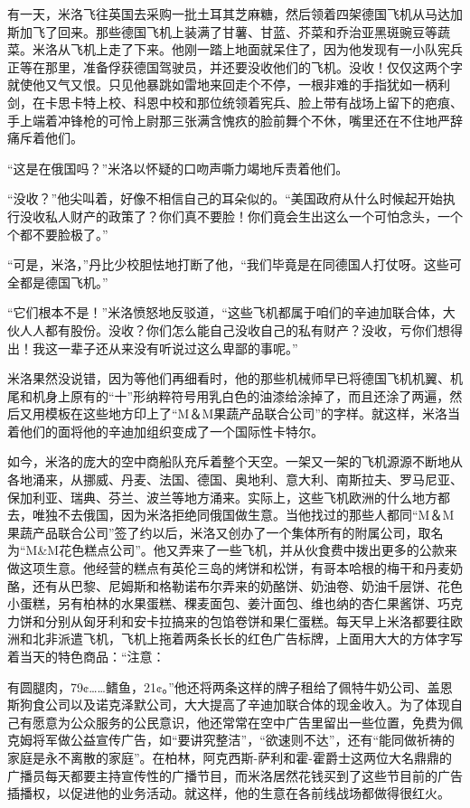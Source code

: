     有一天，米洛飞往英国去采购一批土耳其芝麻糖，然后领着四架德国飞机从马达加斯加飞了回来。那些德国飞机上装满了甘薯、甘蓝、芥菜和乔治亚黑斑豌豆等蔬菜。米洛从飞机上走了下来。他刚一踏上地面就呆住了，因为他发现有一小队宪兵正等在那里，准备俘获德国驾驶员，并还要没收他们的飞机。没收！仅仅这两个字就使他又气又恨。只见他暴跳如雷地来回走个不停，一根非难的手指犹如一柄利剑，在卡思卡特上校、科恩中校和那位统领着宪兵、脸上带有战场上留下的疤痕、手上端着冲锋枪的可怜上尉那三张满含愧疚的脸前舞个不休，嘴里还在不住地严辞痛斥着他们。

    “这是在俄国吗？”米洛以怀疑的口吻声嘶力竭地斥责着他们。

    “没收？”他尖叫着，好像不相信自己的耳朵似的。“美国政府从什么时候起开始执行没收私人财产的政策了？你们真不要脸！你们竟会生出这么一个可怕念头，一个个都不要脸极了。”

    “可是，米洛，”丹比少校胆怯地打断了他，“我们毕竟是在同德国人打仗呀。这些可全都是德国飞机。”

    “它们根本不是！”米洛愤怒地反驳道，“这些飞机都属于咱们的辛迪加联合体，大伙人人都有股份。没收？你们怎么能自己没收自己的私有财产？没收，亏你们想得出！我这一辈子还从来没有听说过这么卑鄙的事呢。”

    米洛果然没说错，因为等他们再细看时，他的那些机械师早已将德国飞机机翼、机尾和机身上原有的“十”形纳粹符号用乳白色的油漆给涂掉了，而且还涂了两遍，然后又用模板在这些地方印上了“M＆M果蔬产品联合公司”的字样。就这样，米洛当着他们的面将他的辛迪加组织变成了一个国际性卡特尔。

 


    如今，米洛的庞大的空中商船队充斥着整个天空。一架又一架的飞机源源不断地从各地涌来，从挪威、丹麦、法国、德国、奥地利、意大利、南斯拉夫、罗马尼亚、保加利亚、瑞典、芬兰、波兰等地方涌来。实际上，这些飞机欧洲的什么地方都去，唯独不去俄国，因为米洛拒绝同俄国做生意。当他找过的那些人都同“M＆M果蔬产品联合公司”签了约以后，米洛又创办了一个集体所有的附属公司，取名为“M&M花色糕点公司”。他又弄来了一些飞机，并从伙食费中拨出更多的公款来做这项生意。他经营的糕点有英伦三岛的烤饼和松饼，有哥本哈根的梅干和丹麦奶酪，还有从巴黎、尼姆斯和格勒诺布尔弄来的奶酪饼、奶油卷、奶油千层饼、花色小蛋糕，另有柏林的水果蛋糕、稞麦面包、姜汁面包、维也纳的杏仁果酱饼、巧克力饼和分别从匈牙利和安卡拉搞来的包馅卷饼和果仁蛋糕。每天早上米洛都要往欧洲和北非派遣飞机，飞机上拖着两条长长的红色广告标牌，上面用大大的方体字写着当天的特色商品：“注意：

    有圆腿肉，79¢……鳍鱼，21¢。”他还将两条这样的牌子租给了佩特牛奶公司、盖恩斯狗食公司以及诺克泽默公司，大大提高了辛迪加联合体的现金收入。为了体现自己有愿意为公众服务的公民意识，他还常常在空中广告里留出一些位置，免费为佩克姆将军做公益宣传广告，如“要讲究整洁”，“欲速则不达”，还有“能同做祈祷的家庭是永不离散的家庭”。在柏林，阿克西斯-萨利和霍-霍爵士这两位大名鼎鼎的广播员每天都要主持宣传性的广播节目，而米洛居然花钱买到了这些节目前的广告插播权，以促进他的业务活动。就这样，他的生意在各前线战场都做得很红火。

